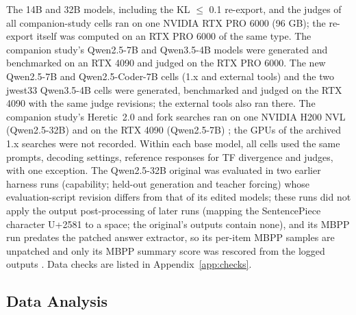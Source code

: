 The 14B and 32B models, including the KL $\le$ 0.1 re-export, and the judges of all companion-study cells ran on one
NVIDIA RTX PRO 6000 (96 GB); the re-export itself was computed on an RTX PRO 6000 of the same type. The companion
study's Qwen2.5-7B and Qwen3.5-4B models were generated and benchmarked on an RTX 4090 and judged on the RTX PRO
6000. The new Qwen2.5-7B and Qwen2.5-Coder-7B cells (1.x and external tools) and the two jwest33 Qwen3.5-4B cells
were generated, benchmarked and judged on the RTX 4090 with the same judge revisions; the external tools also ran
there. The companion study's Heretic~2.0 and fork searches ran on one NVIDIA H200 NVL (Qwen2.5-32B) and on the
RTX 4090 (Qwen2.5-7B) \cite{young2026harder}; the GPUs of the archived 1.x searches were not recorded. Within each
base model, all cells used the same prompts, decoding settings, reference responses for TF
divergence and judges, with one exception. The Qwen2.5-32B original was evaluated in two earlier harness runs
(capability; held-out generation and teacher forcing) whose evaluation-script revision differs from that of its
edited models; these runs did not apply the output post-processing of later runs (mapping the SentencePiece
character U+2581 to a space; the original's outputs contain none), and its MBPP run predates the patched answer
extractor, so its per-item MBPP samples are unpatched and only its MBPP summary score was rescored from the logged
outputs \cite{young2026harder}. Data checks are listed in Appendix~\ref{app:checks}.

\subsection{Data Analysis}
\label{sec:stats}

